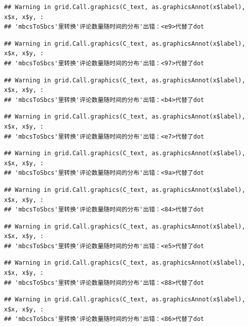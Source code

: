 \documentclass[
]{article}
\begin{document}
\begin{verbatim}
## Warning in grid.Call.graphics(C_text, as.graphicsAnnot(x$label), x$x, x$y, :
## 'mbcsToSbcs'里转换'评论数量随时间的分布'出错：<e9>代替了dot
\end{verbatim}

\begin{verbatim}
## Warning in grid.Call.graphics(C_text, as.graphicsAnnot(x$label), x$x, x$y, :
## 'mbcsToSbcs'里转换'评论数量随时间的分布'出错：<97>代替了dot
\end{verbatim}

\begin{verbatim}
## Warning in grid.Call.graphics(C_text, as.graphicsAnnot(x$label), x$x, x$y, :
## 'mbcsToSbcs'里转换'评论数量随时间的分布'出错：<b4>代替了dot
\end{verbatim}

\begin{verbatim}
## Warning in grid.Call.graphics(C_text, as.graphicsAnnot(x$label), x$x, x$y, :
## 'mbcsToSbcs'里转换'评论数量随时间的分布'出错：<e7>代替了dot
\end{verbatim}

\begin{verbatim}
## Warning in grid.Call.graphics(C_text, as.graphicsAnnot(x$label), x$x, x$y, :
## 'mbcsToSbcs'里转换'评论数量随时间的分布'出错：<9a>代替了dot
\end{verbatim}

\begin{verbatim}
## Warning in grid.Call.graphics(C_text, as.graphicsAnnot(x$label), x$x, x$y, :
## 'mbcsToSbcs'里转换'评论数量随时间的分布'出错：<84>代替了dot
\end{verbatim}

\begin{verbatim}
## Warning in grid.Call.graphics(C_text, as.graphicsAnnot(x$label), x$x, x$y, :
## 'mbcsToSbcs'里转换'评论数量随时间的分布'出错：<e5>代替了dot
\end{verbatim}

\begin{verbatim}
## Warning in grid.Call.graphics(C_text, as.graphicsAnnot(x$label), x$x, x$y, :
## 'mbcsToSbcs'里转换'评论数量随时间的分布'出错：<88>代替了dot
\end{verbatim}

\begin{verbatim}
## Warning in grid.Call.graphics(C_text, as.graphicsAnnot(x$label), x$x, x$y, :
## 'mbcsToSbcs'里转换'评论数量随时间的分布'出错：<86>代替了dot
\end{verbatim}
\end{document}
